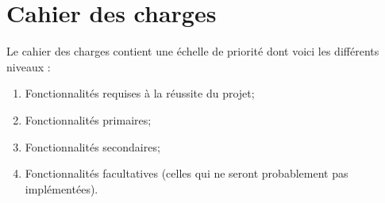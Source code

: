 \clearpage
\section{Cahier des charges}

\noindent Le cahier des charges contient une échelle de priorité dont voici les différents niveaux :
\begin{enumerate}
	\item Fonctionnalités requises à la réussite du projet;
	\item Fonctionnalités primaires;
	\item Fonctionnalités secondaires;
	\item Fonctionnalités facultatives (celles qui ne seront probablement pas implémentées).
\end{enumerate}








